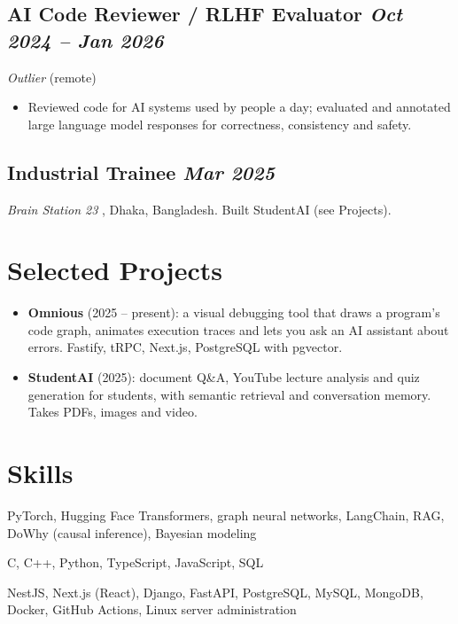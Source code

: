 \documentclass[10pt, a4paper]{article}
\newcommand{\datedsubsection}[2]{\needspace{8\baselineskip}\subsection*{#1 \hfill \small\textit{#2}}}
\newcommand{\resitem}[1]{\item #1}
\begin{document}
\datedsubsection{AI Code Reviewer / RLHF Evaluator}{Oct 2024 -- Jan 2026}
\textit{Outlier} \href{https://www.linkedin.com/company/try-outlier/}{\small\faExternalLink*} (remote)
\begin{itemize}
    \resitem{Reviewed code for AI systems used by \factExpOutlierUsers{} people a day; evaluated and annotated large language model responses for correctness, consistency and safety.}
\end{itemize}

\datedsubsection{Industrial Trainee}{Mar 2025}
\textit{Brain Station 23} \href{https://brainstation-23.com/}{\small\faExternalLink*}, Dhaka, Bangladesh. Built StudentAI (see Projects).

\section{Selected Projects}
\begin{itemize}
    \resitem{\textbf{Omnious} \href{https://www.mehedi-hasan-maruf.me/projects/omnious}{\faExternalLink*} (2025 -- present): a visual debugging tool that draws a program's code graph, animates execution traces and lets you ask an AI assistant about errors. Fastify, tRPC, Next.js, PostgreSQL with pgvector.}
    \resitem{\textbf{StudentAI} \href{https://www.mehedi-hasan-maruf.me/projects/student-ai}{\faExternalLink*} (2025): document Q\&A, YouTube lecture analysis and quiz generation for students, with semantic retrieval and conversation memory. Takes PDFs, images and video.}
\end{itemize}

\section{Skills}
\begin{description}[style=unboxed, leftmargin=0pt]
    \item[AI/ML:] PyTorch, Hugging Face Transformers, graph neural networks, LangChain, RAG, DoWhy (causal inference), Bayesian modeling
    \item[Languages:] C, C++, Python, TypeScript, JavaScript, SQL
    \item[Web and systems:] NestJS, Next.js (React), Django, FastAPI, PostgreSQL, MySQL, MongoDB, Docker, GitHub Actions, Linux server administration
\end{description}

\end{document}
